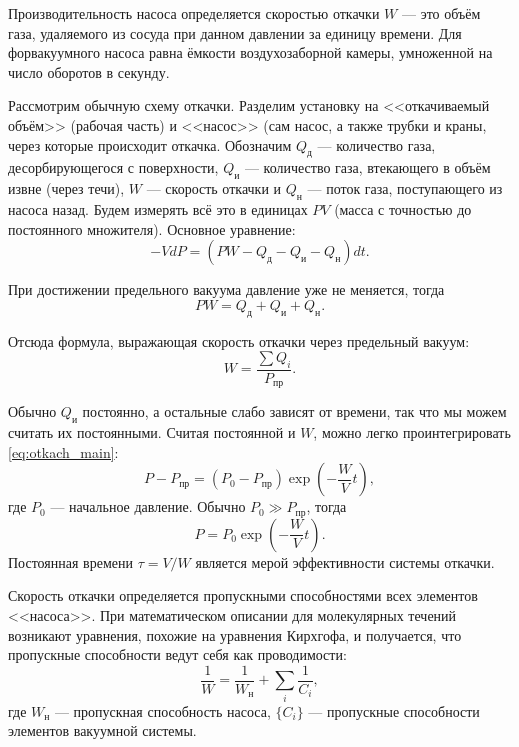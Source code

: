 \documentclass[12pt]{article}
\begin{document}
	Производительность насоса определяется скоростью откачки $W$ --- это объём газа, удаляемого из сосуда при данном давлении за единицу времени. Для форвакуумного насоса равна ёмкости воздухозаборной камеры, умноженной на число оборотов в секунду.
	
	Рассмотрим обычную схему откачки. Разделим установку на <<откачиваемый объём>> (рабочая часть) и <<насос>> (сам насос, а также трубки и краны, через которые происходит откачка. Обозначим $Q_\text{д}$ --- количество газа, десорбирующегося с поверхности, $Q_\text{и}$ --- количество газа, втекающего в объём извне (через течи), $W$ --- скорость откачки и $Q_\text{н}$ --- поток газа, поступающего из насоса назад. Будем измерять всё это в единицах $PV$ (масса с точностью до постоянного множителя). Основное уравнение:
	\begin{equation}
		\label{eq:otkach_main}
		-VdP=(PW-Q_\text{д}-Q_\text{и}-Q_\text{н})dt.
	\end{equation}
	
	При достижении предельного вакуума давление уже не меняется, тогда
	\begin{equation}
		\label{eq:otkach_bal_pred}
		PW=Q_\text{д}+Q_\text{и}+Q_\text{н}.
	\end{equation}
	
	Отсюда формула, выражающая скорость откачки через предельный вакуум:
	\begin{equation}
		\label{eq:otkach_sp_pred}
		W=\frac{\sum Q_i}{P_\text{пр}}.
	\end{equation}
	
	Обычно $Q_\text{и}$ постоянно, а остальные слабо зависят от времени, так что мы можем считать их постоянными. Считая постоянной и $W$, можно легко проинтегрировать \eqref{eq:otkach_main}:
	\begin{equation}
		\label{eq:otkach_sol}
		P-P_\text{пр}=(P_0-P_\text{пр}) \exp \left( -\frac{W}{V}t \right),
	\end{equation}
	где $P_0$ --- начальное давление. Обычно $P_0 \gg P_\text{пр}$, тогда
	\begin{equation}
		\label{eq:otkach_sol_approx}
		P=P_0 \exp \left( -\frac{W}{V}t \right).
	\end{equation}
	Постоянная времени $\tau=V/W$ является мерой эффективности системы откачки.
	
	Скорость откачки определяется пропускными способностями всех элементов <<насоса>>. При математическом описании для молекулярных течений возникают уравнения, похожие на уравнения Кирхгофа, и получается, что пропускные способности ведут себя как проводимости:
	\begin{equation}
		\label{eq:prop_abil}
		\frac{1}{W}=\frac{1}{W_\text{н}} + \sum_i \frac{1}{C_i},
	\end{equation}
	где $W_\text{н}$ --- пропускная способность насоса, $\{C_i\}$ --- пропускные способности элементов вакуумной системы.
	
\end{document}

